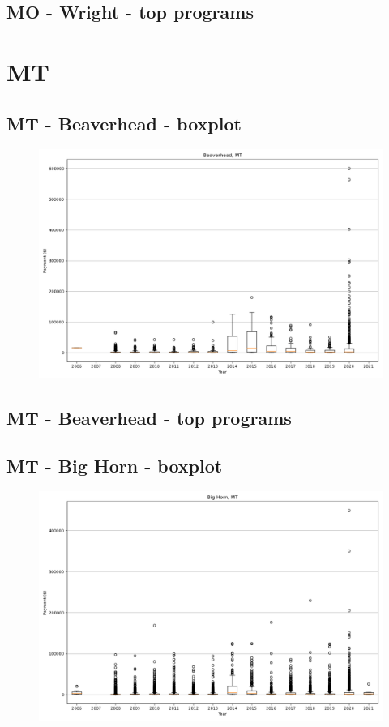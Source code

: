 \subsection*{MO - Wright - top programs}

\newpage
\section*{MT}
\subsection*{MT - Beaverhead - boxplot}
\begin{figure}[h]
\centering
\includegraphics[width=7in]{../output/boxplots/counties/Beaverhead-MT_boxplot.png}
\end{figure}


\subsection*{MT - Beaverhead - top programs}

\newpage
\subsection*{MT - Big Horn - boxplot}
\begin{figure}[h]
\centering
\includegraphics[width=7in]{../output/boxplots/counties/Big Horn-MT_boxplot.png}
\end{figure}


